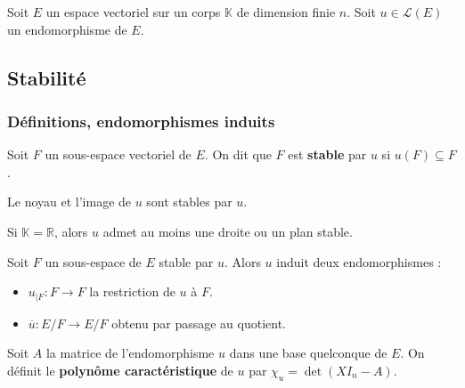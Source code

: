 




  Soit $E$ un espace vectoriel sur un corps $\mathbb{K}$ de dimension finie $n$. Soit $u \in \mathcal{L}(E)$ un endomorphisme de $E$.

  \subsection{Stabilité}

  \subsubsection{Définitions, endomorphismes induits}


  \begin{definition}
    Soit $F$ un sous-espace vectoriel de $E$. On dit que $F$ est \textbf{stable} par $u$ si $u(F) \subseteq F$.
  \end{definition}

  \begin{example}
    Le noyau et l'image de $u$ sont stables par $u$.
  \end{example}

  \begin{proposition}
    Si $\mathbb{K} = \mathbb{R}$, alors $u$ admet au moins une droite ou un plan stable.
  \end{proposition}

  \begin{proposition}
    Soit $F$ un sous-espace de $E$ stable par $u$. Alors $u$ induit deux endomorphismes :
    \begin{itemize}
      \item $u_{|F} : F \rightarrow F$ la restriction de $u$ à $F$.
      \item $\overline{u} : E/F \rightarrow E/F$ obtenu par passage au quotient.
    \end{itemize}
  \end{proposition}


  \begin{definition}
    Soit $A$ la matrice de l'endomorphisme $u$ dans une base quelconque de $E$. On définit le \textbf{polynôme caractéristique} de $u$ par $\chi_u = \det{(X I_n - A)}$.
  \end{definition}

